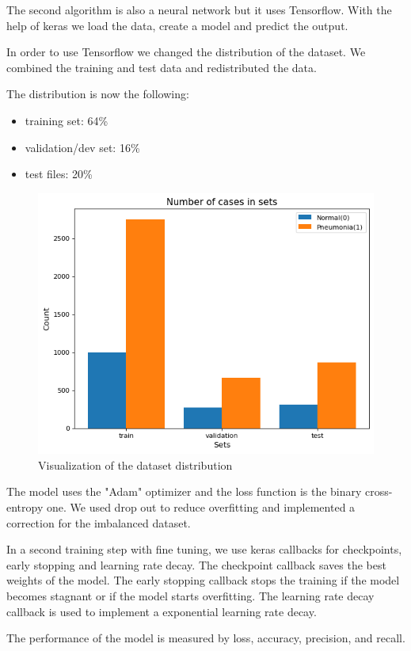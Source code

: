 \documentclass{article}
\begin{document}
The second algorithm is also a neural network but it uses Tensorflow. 
With the help of keras we load the data, create a model and predict the output.

In order to use Tensorflow we changed the distribution of the dataset.
We combined the training and test data and redistributed the data.

The distribution is now the following:
\begin{itemize}
  \item training set: 64\%
  \item validation/dev set: 16\%
  \item test files: 20\%
\end{itemize}

\begin{figure}[h]
  \centering
  \includegraphics[width=0.8\linewidth]{images/datasetVisualization.png}
  \caption{Visualization of the dataset distribution}
  \label{fig:tensorflow_dataset_distribution}
\end{figure}

The model uses the "Adam" optimizer and the loss function is the binary cross-entropy one.
We used drop out to reduce overfitting and implemented a correction for the imbalanced dataset.

In a second training step with fine tuning, we use keras callbacks for checkpoints, 
early stopping and learning rate decay.
The checkpoint callback saves the best weights of the model. 
The early stopping callback stops the training if the model becomes stagnant or if the model starts overfitting. The learning rate decay callback is used to implement a exponential learning rate decay.

The performance of the model is measured by loss, accuracy, precision, and recall.
\end{document}
